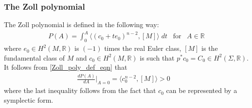 \documentclass[11pt]{amsart}
\theoremstyle{plain}
\theoremstyle{definition}
\theoremstyle{remark}
\newtheorem{remark}[theorem]{Remark}
\begin{document}
\subsubsection{The Zoll polynomial}\label{zoll_poly_section}
The Zoll polynomial is defined in the following way:
\begin{align}\label{Zoll_poly_def_eqn}
     P(A) = \int^A_0 \langle (c_0+te_0)^{n-2},[M] \rangle \; dt \;\;\; \text{for} \;\;\; A \in \mathbb{R}
\end{align}
where $e_0 \in H^2(M,\mathbb{R})$ is $(-1)$ times the real Euler class, $[M]$ is the fundamental class of $M$ and $c_0 \in H^2(M,\mathbb{R})$ is such that $p^*c_0 = C_0 \in H^2(\Sigma, \mathbb{R})$. It follows from \eqref{Zoll_poly_def_eqn} that
\begin{align}\label{montonicity_of_zoll_poly}
    \frac{dP(A)}{d A}\Big|_{A=0} = \langle c_0^{n-2}, [M] \rangle >0 \;\;\; 
\end{align}
where the last inequality follows from the fact that $c_0$ can be represented by a symplectic form.
\end{document}

